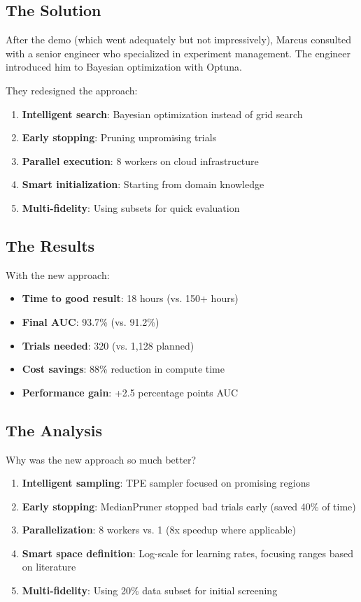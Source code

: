 \subsection{The Solution}

After the demo (which went adequately but not impressively), Marcus consulted with a senior engineer who specialized in experiment management. The engineer introduced him to Bayesian optimization with Optuna.

They redesigned the approach:

\begin{enumerate}
    \item \textbf{Intelligent search}: Bayesian optimization instead of grid search
    \item \textbf{Early stopping}: Pruning unpromising trials
    \item \textbf{Parallel execution}: 8 workers on cloud infrastructure
    \item \textbf{Smart initialization}: Starting from domain knowledge
    \item \textbf{Multi-fidelity}: Using subsets for quick evaluation
\end{enumerate}

\subsection{The Results}

With the new approach:

\begin{itemize}
    \item \textbf{Time to good result}: 18 hours (vs. 150+ hours)
    \item \textbf{Final AUC}: 93.7\% (vs. 91.2\%)
    \item \textbf{Trials needed}: 320 (vs. 1,128 planned)
    \item \textbf{Cost savings}: 88\% reduction in compute time
    \item \textbf{Performance gain}: +2.5 percentage points AUC
\end{itemize}

\subsection{The Analysis}

Why was the new approach so much better?

\begin{enumerate}
    \item \textbf{Intelligent sampling}: TPE sampler focused on promising regions
    \item \textbf{Early stopping}: MedianPruner stopped bad trials early (saved 40\% of time)
    \item \textbf{Parallelization}: 8 workers vs. 1 (8x speedup where applicable)
    \item \textbf{Smart space definition}: Log-scale for learning rates, focusing ranges based on literature
    \item \textbf{Multi-fidelity}: Using 20\% data subset for initial screening
\end{enumerate}


